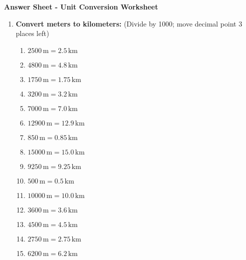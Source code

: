 \documentclass[12pt]{article}
\begin{document}
\vfill
\newpage

\pagestyle{answersheetstyle}

\begin{center}
    \Large \textbf{Answer Sheet - Unit Conversion Worksheet}
\end{center}
\vspace{10pt}

\begin{enumerate}
    \item \textbf{Convert meters to kilometers:}
    (Divide by 1000; move decimal point 3 places left)
    \begin{multicols}{2}
    \begin{enumerate}
        \item \(2500 \, \text{m} = 2.5 \, \text{km}\)
        \item \(4800 \, \text{m} = 4.8 \, \text{km}\)
        \item \(1750 \, \text{m} = 1.75 \, \text{km}\)
        \item \(3200 \, \text{m} = 3.2 \, \text{km}\)
        \item \(7000 \, \text{m} = 7.0 \, \text{km}\)
        \item \(12900 \, \text{m} = 12.9 \, \text{km}\)
        \item \(850 \, \text{m} = 0.85 \, \text{km}\)
        \item \(15000 \, \text{m} = 15.0 \, \text{km}\)
        \item \(9250 \, \text{m} = 9.25 \, \text{km}\)
        \item \(500 \, \text{m} = 0.5 \, \text{km}\)
        \item \(10000 \, \text{m} = 10.0 \, \text{km}\)
        \item \(3600 \, \text{m} = 3.6 \, \text{km}\)
        \item \(4500 \, \text{m} = 4.5 \, \text{km}\)
        \item \(2750 \, \text{m} = 2.75 \, \text{km}\)
        \item \(6200 \, \text{m} = 6.2 \, \text{km}\)
    \end{enumerate}
    \end{multicols}


\end{enumerate}
\end{document}
